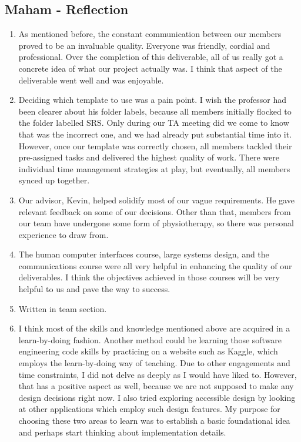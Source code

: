 \documentclass[12pt]{article}
\begin{document}
\subsection*{Maham - Reflection}
\begin{enumerate}
  \item As mentioned before, the constant communication between our members proved to be an invaluable quality. Everyone was friendly, cordial and professional. Over the completion of this deliverable, all of us really got a concrete idea of what our project actually was. I think that aspect of the deliverable went well and was enjoyable. 
  \item Deciding which template to use was a pain point. I wish the professor had been clearer about his folder labels, because all members initially flocked to the folder labelled SRS. Only during our TA meeting did we come to know that was the incorrect one, and we had already put substantial time into it. However, once our template was correctly chosen, all members tackled their pre-assigned tasks and delivered the highest quality of work. There were individual time management strategies at play, but eventually, all members synced up together.
  \item Our advisor, Kevin, helped solidify most of our vague requirements. He gave relevant feedback on some of our decisions. Other than that, members from our team have undergone some form of physiotherapy, so there was personal experience to draw from. 
  \item The human computer interfaces course, large systems design, and the communications course were all very helpful in enhancing the quality of our deliverables. I think the objectives achieved in those courses will be very helpful to us and pave the way to success.
  \item Written in team section.
  \item I think most of the skills and knowledge mentioned above are acquired in a learn-by-doing fashion. Another method could be learning those software engineering code skills by practicing on a website such as Kaggle, which employs the learn-by-doing way of teaching. Due to other engagements and time constraints, I did not delve as deeply as I would have liked to. However, that has a positive aspect as well, because we are not supposed to make any design decisions right now. I also tried exploring accessible design by looking at other applications which employ such design features. My purpose for choosing these two areas to learn was to establish a basic foundational idea and perhaps start thinking about implementation details. \\
\end{enumerate}
\end{document}
